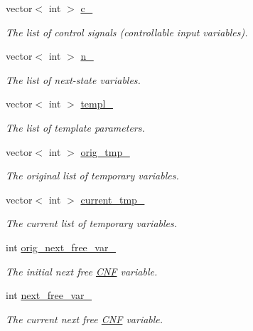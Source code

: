 \begin{DoxyCompactItemize}
vector$<$ int $>$ \hyperlink{classTemplExplorer_a84a186d44f9ac9234dfeb9d5960951cf}{c\-\_\-}
\begin{DoxyCompactList}\small\item\em The list of control signals (controllable input variables). \end{DoxyCompactList}\item 
vector$<$ int $>$ \hyperlink{classTemplExplorer_a58af33d991f5670d856dec1358e2faea}{n\-\_\-}
\begin{DoxyCompactList}\small\item\em The list of next-\/state variables. \end{DoxyCompactList}\item 
vector$<$ int $>$ \hyperlink{classTemplExplorer_ae3dcf416014ff2ec4120abbd9fba5149}{templ\-\_\-}
\begin{DoxyCompactList}\small\item\em The list of template parameters. \end{DoxyCompactList}\item 
vector$<$ int $>$ \hyperlink{classTemplExplorer_a78b116eb73648638c926f22f6a7a74fc}{orig\-\_\-tmp\-\_\-}
\begin{DoxyCompactList}\small\item\em The original list of temporary variables. \end{DoxyCompactList}\item 
vector$<$ int $>$ \hyperlink{classTemplExplorer_a2fdba5ec13386e390ca5bb2023afee9c}{current\-\_\-tmp\-\_\-}
\begin{DoxyCompactList}\small\item\em The current list of temporary variables. \end{DoxyCompactList}\item 
int \hyperlink{classTemplExplorer_a3561a52c7e33d2b49d09fab789824464}{orig\-\_\-next\-\_\-free\-\_\-var\-\_\-}
\begin{DoxyCompactList}\small\item\em The initial next free \hyperlink{classCNF}{C\-N\-F} variable. \end{DoxyCompactList}\item 
int \hyperlink{classTemplExplorer_ab0f61981e91a348778822f69ea1b58ee}{next\-\_\-free\-\_\-var\-\_\-}
\begin{DoxyCompactList}\small\item\em The current next free \hyperlink{classCNF}{C\-N\-F} variable. \end{DoxyCompactList}\item 

\end{DoxyCompactItemize}
